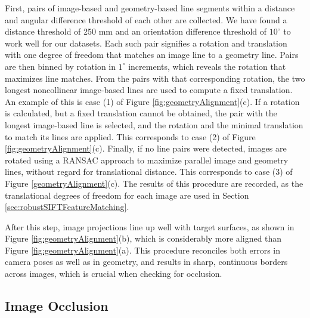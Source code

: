 \documentclass{llncs}
\begin{document}
First, pairs of image-based and geometry-based line segments within a
distance and angular difference threshold of each other are
collected. We have found a distance threshold of 250 mm and an
orientation difference threshold of $10^\circ$ to work well for our
datasets. Each such pair signifies a rotation and translation with one
degree of freedom that matches an image line to a geometry line. Pairs
are then binned by rotation in $1^\circ$ increments, which reveals the
rotation that maximizes line matches. From the pairs with that
corresponding rotation, the two longest noncollinear image-based lines
are used to compute a fixed translation. An example of this is case
(1) of Figure \ref{fig:geometryAlignment}(c). If a rotation is
calculated, but a fixed translation cannot be obtained, the pair with
the longest image-based line is selected, and the rotation and the
minimal translation to match its lines are applied. This corresponds
to case (2) of Figure \ref{fig:geometryAlignment}(c). Finally, if no
line pairs were detected, images are rotated using a RANSAC
\cite{fischler1981random} approach to maximize parallel image and
geometry lines, without regard for translational distance. This
corresponds to case (3) of Figure \ref{geometryAlignment}(c). The
results of this procedure are recorded, as the translational degrees
of freedom for each image are used in Section
\ref{sec:robustSIFTFeatureMatching}.

After this step, image projections line up well with target surfaces,
as shown in Figure \ref{fig:geometryAlignment}(b), which is
considerably more aligned than Figure
\ref{fig:geometryAlignment}(a). This procedure reconciles both errors
in camera poses as well as in geometry, and results in sharp,
continuous borders across images, which is crucial when checking for
occlusion.


\subsection{Image Occlusion}
\label{sec:imageOcclusion}
\end{document}
